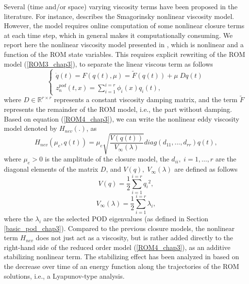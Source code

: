 \documentclass[letterpaper,conference,onecolumn,11pt]{IEEEtran}
\begin{document}
Several (time and/or space) varying viscosity terms have been proposed
in the literature. For instance, \cite{SI13} describes the Smagorinsky
nonlinear viscosity model. However, the model requires online
computation of some nonlinear closure terms at each time step, which
in general makes it computationally consuming. We report here the
nonlinear viscosity model presented in \cite{CNTLDBDN13}, which is
nonlinear and a function of the ROM state variables. This requires
explicit rewriting of the ROM model (\ref{ROM3_chap3}), to separate
the linear viscous term as follows
\begin{equation}\label{ROM4_chap3}
\left\{\begin{array}{l}
\dot{q}(t) =F(q(t),\mu)=\tilde{F}(q(t))+\mu\;Dq(t)\\
z_n^{pod}(t,x)=\sum_{i=1}^{i=r}\phi_{i}(x)q_{i}(t),
\end{array}\right.
\end{equation}
where $D\in\mathbb{R}^{r\times r}$ represents a constant viscosity
damping matrix, and the term $\tilde{F}$ represents the remainder
of the ROM model, i.e., the part without damping. \\Based on
equation (\ref{ROM4_chap3}), we can write the nonlinear eddy
viscosity model denoted by $H_{nev}(.)$, as
\begin{equation}\label{Smagorinsky_CHAP3}
H_{nev}(\mu_e,
q(t))=\mu_{e}\sqrt{\frac{V(q(t))}{V_{\infty}(\lambda)}}diag(d_{11},...,d_{rr})q(t),
\end{equation}
where $\mu_{e}>0$ is the amplitude of the closure model, the
$d_{ii},\;i=1,\ldots,r$ are the diagonal elements of the matrix
$D$, and $V(q),\;V_{\infty}(\lambda)$ are defined as follows
\begin{equation}\label{V1_CHAP3}
V(q)=\frac{1}{2}\sum_{i=1}^{i=r}{q_{i}}^{2},
\end{equation}
\begin{equation}\label{Vinfty1_CHAP3}
V_{\infty}(\lambda)=\frac{1}{2}\sum_{i=1}^{i=r}\lambda_{i},
\end{equation}
where the $\lambda_{i}$ are the selected POD eigenvalues (as
defined in Section \ref{basic_pod_chap3}). Compared to the
previous closure models, the nonlinear term $H_{nev}$ does not
just act as a viscosity, but is rather added directly to the
right-hand side of the reduced order model (\ref{ROM4_chap3}), as
an additive stabilizing nonlinear term. The stabilizing effect has
been analyzed in \cite{CNTLDBDN13} based on the decrease over time
of an energy function along the trajectories of the ROM solutions,
i.e., a Lyapunov-type analysis.
\end{document}

